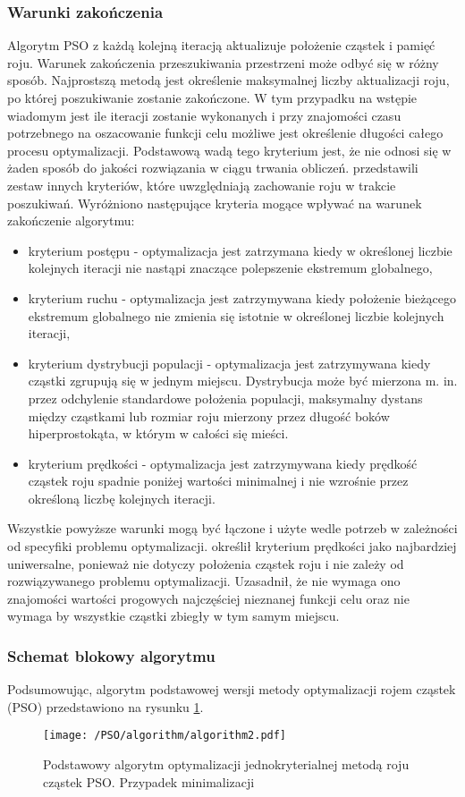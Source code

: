 \subsubsection{Warunki zakończenia}
Algorytm PSO z każdą kolejną iteracją aktualizuje położenie cząstek i pamięć roju. Warunek zakończenia przeszukiwania przestrzeni może odbyć się w różny sposób. Najprostszą metodą jest określenie maksymalnej liczby aktualizacji roju, po której poszukiwanie zostanie zakończone. W tym przypadku na wstępie wiadomym jest ile iteracji zostanie wykonanych i przy znajomości czasu potrzebnego na oszacowanie funkcji celu możliwe jest określenie długości całego procesu optymalizacji. Podstawową wadą tego kryterium jest, że nie odnosi się w żaden sposób do jakości rozwiązania w ciągu trwania obliczeń. \parencite{Zielinski2007} przedstawili zestaw innych kryteriów, które uwzględniają zachowanie roju w trakcie poszukiwań. Wyróżniono następujące kryteria mogące wpływać na warunek zakończenie algorytmu:
\begin{itemize}[noitemsep]
	\item kryterium postępu - optymalizacja jest zatrzymana kiedy w określonej liczbie kolejnych iteracji nie nastąpi znaczące polepszenie ekstremum globalnego,
	\item kryterium ruchu - optymalizacja jest zatrzymywana kiedy położenie bieżącego ekstremum globalnego nie zmienia się istotnie w określonej liczbie kolejnych iteracji,
	\item kryterium dystrybucji populacji - optymalizacja jest zatrzymywana kiedy cząstki zgrupują się w jednym miejscu. Dystrybucja może być mierzona m. in. przez odchylenie standardowe położenia populacji, maksymalny dystans między cząstkami lub rozmiar roju mierzony przez długość boków hiperprostokąta, w którym w całości się mieści.  
	\item kryterium prędkości - optymalizacja jest zatrzymywana kiedy prędkość cząstek roju spadnie poniżej wartości minimalnej i nie wzrośnie przez określoną liczbę kolejnych iteracji. 
\end{itemize}
Wszystkie powyższe warunki mogą być łączone i użyte wedle potrzeb w zależności od specyfiki problemu optymalizacji. \cite{Banach2017} określił kryterium prędkości jako najbardziej uniwersalne, ponieważ nie dotyczy położenia cząstek roju i nie zależy od rozwiązywanego problemu optymalizacji. Uzasadnił, że nie wymaga ono znajomości wartości progowych najczęściej nieznanej funkcji celu oraz nie wymaga by wszystkie cząstki zbiegły w tym samym miejscu.
\subsubsection{Schemat blokowy algorytmu}
Podsumowując, algorytm podstawowej wersji metody optymalizacji rojem cząstek (PSO) przedstawiono na rysunku \ref{fig: pso_single_algorith}.
\begin{figure}[H]
	\centering
	\texttt{[image: /PSO/algorithm/algorithm2.pdf]} 
	\captionsetup{justification=centering}
	\caption{Podstawowy algorytm optymalizacji jednokryterialnej metodą roju cząstek PSO. Przypadek minimalizacji}
	\label{fig: pso_single_algorith}
\end{figure}

